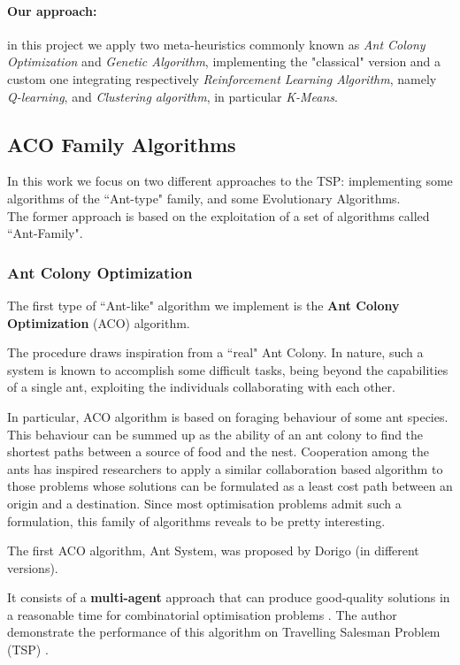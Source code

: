 \documentclass[10pt]{article}
\begin{document}
\paragraph{Our approach:}
in this project we apply two meta-heuristics commonly known as \textit{Ant Colony Optimization} and \textit{Genetic Algorithm}, implementing the "classical" version and a custom one integrating respectively \textit{Reinforcement Learning Algorithm}, namely \textit{Q-learning}, and \textit{Clustering algorithm}, in particular \textit{K-Means}.

\subsection{ACO Family Algorithms}
In this work we focus on two different approaches to the TSP: implementing some algorithms of the ``Ant-type" family, and some Evolutionary Algorithms.
\\The former approach is based on the exploitation of a set of algorithms called ``Ant-Family".

\subsubsection{Ant Colony Optimization} \label{sec:aco}
The first type of ``Ant-like" algorithm we implement is the \textbf{Ant Colony Optimization} (ACO) algorithm.

The procedure draws inspiration from a ``real"  Ant  Colony. 
In nature, such a system is  known  to  accomplish  some  difficult  tasks,  being beyond  the capabilities  of  a  single  ant,  exploiting the individuals collaborating  with  each  other.  

In particular, ACO algorithm  is based on  foraging  behaviour  of  some  ant species.  
This behaviour  can  be  summed up as the ability of an ant colony to find the shortest  paths between  a source of food  and  the nest.
Cooperation  among  the  ants  has inspired researchers to apply a similar collaboration based algorithm to those problems whose solutions can be formulated as a least cost path between an origin and a destination.
Since most optimisation problems  admit such a formulation, this family of algorithms reveals to be pretty interesting.

The first ACO algorithm, Ant System, was proposed by Dorigo \cite{cinque, sei, sette, otto, nove} (in different versions).

It consists of a \textbf{multi-agent} approach that can produce good-quality solutions in a reasonable time for combinatorial optimisation problems \cite{cinque}. 
The author demonstrate the performance of this algorithm on Travelling Salesman  Problem  (TSP) \cite{sei}. 
\end{document}
